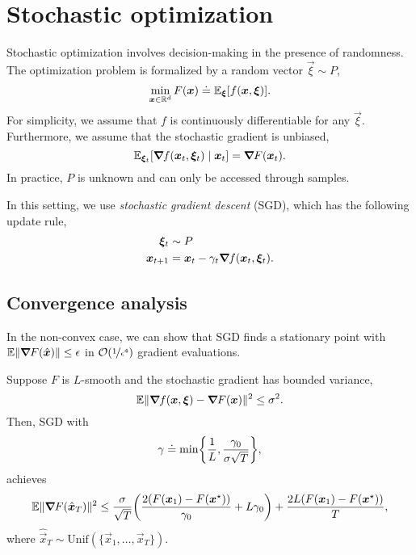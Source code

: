 \section{Stochastic optimization}


Stochastic optimization involves decision-making in the presence of randomness. The optimization
problem is formalized by a random vector $\vec{\xi} \sim P$, \[
    \min_{\bm{x} \in \mathbb{R}^d} F(\bm{x}) \doteq \mathbb{E}_{\bm{\xi}}[f(\bm{x}, \bm{\xi})].
\]
For simplicity, we assume that $f$ is continuously differentiable for any $\vec{\xi}$. Furthermore,
we assume that the stochastic gradient is unbiased, \[
    \mathbb{E}_{\bm{\xi}_t}[\bm{\nabla}_{\! } f(\bm{x}_t, \bm{\xi}_t) \mid \bm{x}_t] = \bm{\nabla}_{\! } F(\bm{x}_t).
\]
In practice, $P$ is unknown and can only be accessed through samples.

In this setting, we use \textit{stochastic gradient descent} (SGD), which has the following update
rule,
\begin{align*}
    \bm{\xi}_t   & \sim P                                                     \\
    \bm{x}_{t+1} & = \bm{x}_t - \gamma_t \bm{\nabla}_{\! } f(\bm{x}_t, \bm{\xi}_t).
\end{align*}

\subsection{Convergence analysis}

In the non-convex case, we can show that SGD finds a stationary point with $\mathbb{E} \|
    \bm{\nabla}_{\! } F(\hat{\bm{x}}) \| \leq \epsilon$ in $\bigo{\nicefrac{1}{\epsilon^4}}$ gradient
evaluations.

\begin{theorem}
    Suppose $F$ is $L$-smooth and the stochastic gradient has bounded variance, \[
        \mathbb{E} \| \bm{\nabla}_{\! } f(\bm{x}, \bm{\xi}) - \bm{\nabla}_{\! } F(\bm{x}) \|^2 \leq \sigma^2.
    \]
    Then, SGD with \[
        \gamma \doteq \min \lft\{ \frac{1}{L}, \frac{\gamma_0}{\sigma \sqrt{T}} \rgt\},
    \]
    achieves \[
        \E \| \grad{F(\hat{\vec{x}}_T)}{} \|^2 \leq \frac{\sigma}{\sqrt{T}} \lft( \frac{2 (F(\vec{x}_1) - F(\vec{x}^\star))}{\gamma_0} + L \gamma_0 \rgt) + \frac{2L(F(\vec{x}_1) - F(\vec{x}^\star))}{T},
    \]
    where $\hat{\vec{x}}_T \sim \mathrm{Unif}(\{ \vec{x}_1, \ldots, \vec{x}_T \})$.
\end{theorem}

